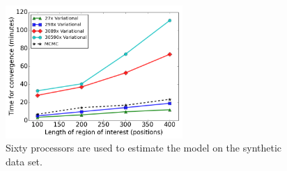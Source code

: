 \documentclass{bmcart}
\begin{document}
\begin{backmatter}
\clearpage
\begin{figure}[ht]
\centering
\includegraphics[width=0.6\textwidth]{timing.png}
\caption{
Sixty processors are used to estimate the model on the synthetic data set.}%
\end{figure}


\end{backmatter}
\end{document}

